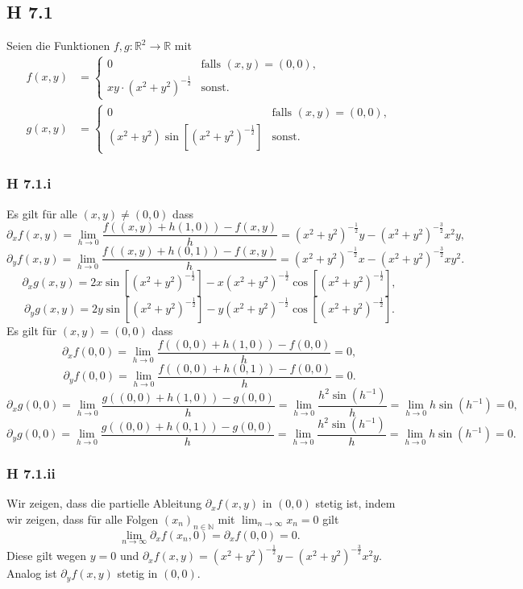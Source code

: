 \documentclass[draft,a5paper]{article}
\theoremstyle{remark}
\begin{document}
\subsection*{H 7.1}
Seien die Funktionen \(f, g\colon \mathbb{R}^{2} \to \mathbb{R}\) mit
\begin{align*}
  f(x, y) &=
  \begin{cases}
    0 & \text{falls } (x, y) = (0, 0), \\
    xy \cdot (x^{2} + y^{2})^{-\frac{1}{2}} & \text{sonst.}
  \end{cases}\\
  g(x, y) &=
  \begin{cases}
    0 & \text{falls } (x, y) = (0, 0), \\
    (x^{2} + y^{2}) \sin{[(x^{2}+y^{2})^{-\frac{1}{2}}]} & \text{sonst.}
  \end{cases}
\end{align*}
\subsubsection*{H 7.1.i}
Es gilt für alle \((x, y) \ne (0, 0)\) dass
\[
  \partial_{x}f(x, y) = \lim_{h \to 0}{\frac{f((x, y) + h(1, 0)) - f(x, y)}{h}}
  = (x^{2} + y^{2})^{-\frac{1}{2}} y -(x^{2} +
  y^{2})^{-\frac{3}{2}}x^{2}y,
\]
\[
  \partial_{y}f(x, y) = \lim_{h \to 0}{\frac{f((x, y) + h(0, 1)) - f(x, y)}{h}}
  = (x^{2} + y^{2})^{-\frac{1}{2}} x -(x^{2} +
  y^{2})^{-\frac{3}{2}}xy^{2}.
\]
\[
  \partial_{x}g(x, y) = 2x \sin[(x^{2} + y^{2})^{-\frac{1}{2}}] - x (x^{2} +
  y^{2})^{-\frac{1}{2}} \cos[(x^{2} + y^{2})^{-\frac{1}{2}}],
\]
\[
  \partial_{y}g(x, y) = 2y \sin[(x^{2} + y^{2})^{-\frac{1}{2}}] - y (x^{2} +
  y^{2})^{-\frac{1}{2}} \cos[(x^{2} + y^{2})^{-\frac{1}{2}}].
\]
Es gilt für \((x, y) = (0, 0)\) dass
\[
  \partial_{x}f(0, 0) = \lim_{h \to 0}{\frac{f((0, 0) + h(1, 0)) - f(0, 0)}{h}}
  = 0,
\]
\[
  \partial_{y}f(0, 0) = \lim_{h \to 0}{\frac{f((0, 0) + h(0, 1)) - f(0, 0)}{h}}
  = 0.
\]
\[
  \partial_{x}g(0, 0) = \lim_{h \to 0}{\frac{g((0, 0) + h(1, 0)) - g(0, 0)}{h}}
  = \lim_{h \to 0}{\frac{h^{2} \sin (h^{-1})}{h}} = \lim_{h \to 0}{h \sin
    (h^{-1})} = 0,
\]
\[
  \partial_{y}g(0, 0) = \lim_{h \to 0}{\frac{g((0, 0) + h(0, 1)) - g(0, 0)}{h}}
  = \lim_{h \to 0}{\frac{h^{2} \sin (h^{-1})}{h}} = \lim_{h \to 0}{h \sin
    (h^{-1})} = 0.
\]
\subsubsection*{H 7.1.ii}
Wir zeigen, dass die partielle Ableitung \(\partial_{x}f(x, y)\) in \((0,
0)\) stetig ist, indem wir zeigen, dass für alle Folgen
\((x_{n})_{n \in \mathbb{N}}\) mit \(\lim_{n \to \infty}{x_{n}} = 0\) gilt
\[\lim_{n \to \infty}{\partial_{x}f(x_{n}, 0)} = \partial_{x}f(0, 0) = 0.\]
Diese gilt wegen \(y = 0\) und
\(\partial_{x}f(x, y) = (x^{2} + y^{2})^{-\frac{1}{2}} y -(x^{2} +
y^{2})^{-\frac{3}{2}}x^{2}y.\)  Analog ist \(\partial_{y}f(x, y)\) stetig in
\((0, 0)\).
\end{document}
